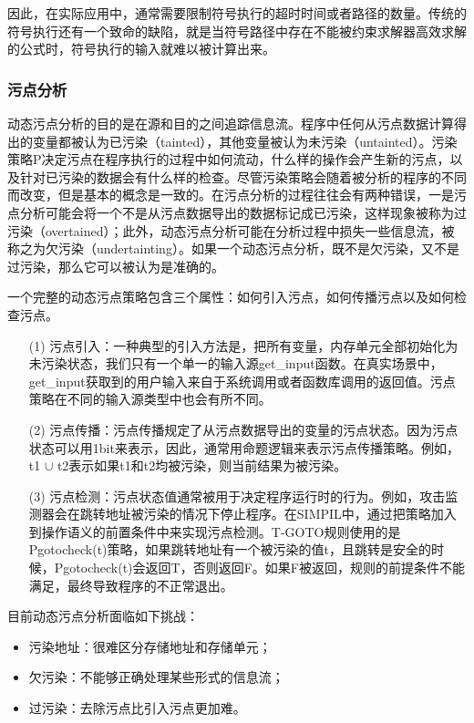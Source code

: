 \documentclass[doctor,privacy,twoside]{buaa_mac}
\begin{document}
因此，在实际应用中，通常需要限制符号执行的超时时间或者路径的数量。传统的符号执行还有一个致命的缺陷，就是当符号路径中存在不能被约束求解器高效求解的公式时，符号执行的输入就难以被计算出来。

\subsubsection{污点分析}

动态污点分析的目的是在源和目的之间追踪信息流。程序中任何从污点数据计算得出的变量都被认为已污染（tainted），其他变量被认为未污染（untainted）。污染策略P决定污点在程序执行的过程中如何流动，什么样的操作会产生新的污点，以及针对已污染的数据会有什么样的检查。尽管污染策略会随着被分析的程序的不同而改变，但是基本的概念是一致的。在污点分析的过程往往会有两种错误，一是污点分析可能会将一个不是从污点数据导出的数据标记成已污染，这样现象被称为过污染（overtained）；此外，动态污点分析可能在分析过程中损失一些信息流，被称之为欠污染（undertainting）。如果一个动态污点分析，既不是欠污染，又不是过污染，那么它可以被认为是准确的。

一个完整的动态污点策略包含三个属性：如何引入污点，如何传播污点以及如何检查污点。
\begin{itemize}
\item[(1)] 污点引入：一种典型的引入方法是，把所有变量，内存单元全部初始化为未污染状态，我们只有一个单一的输入源get\_{}input函数。在真实场景中，get\_{}input获取到的用户输入来自于系统调用或者函数库调用的返回值。污点策略在不同的输入源类型中也会有所不同。
\item[(2)] 污点传播：污点传播规定了从污点数据导出的变量的污点状态。因为污点状态可以用1bit来表示，因此，通常用命题逻辑来表示污点传播策略。例如，t1 $\cup$ t2表示如果t1和t2均被污染，则当前结果为被污染。
\item[(3)] 污点检测：污点状态值通常被用于决定程序运行时的行为。例如，攻击监测器会在跳转地址被污染的情况下停止程序。在SIMPIL中，通过把策略加入到操作语义的前置条件中来实现污点检测。T-GOTO规则使用的是Pgotocheck(t)策略，如果跳转地址有一个被污染的值t，且跳转是安全的时候，Pgotocheck(t)会返回T，否则返回F。如果F被返回，规则的前提条件不能满足，最终导致程序的不正常退出。
\end{itemize}

目前动态污点分析面临如下挑战：
\begin{itemize}
\item 污染地址：很难区分存储地址和存储单元；
\item 欠污染：不能够正确处理某些形式的信息流；
\item 过污染：去除污点比引入污点更加难。
\end{itemize}
\end{document}
